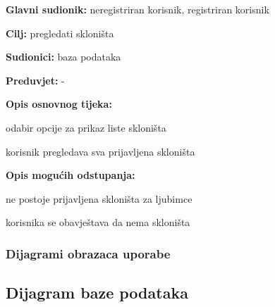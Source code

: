 					\noindent {}
					\begin{packed_item}
						
						\item \textbf{Glavni sudionik: } neregistriran korisnik, registriran korisnik
						\item  \textbf{Cilj:} pregledati skloništa
						\item  \textbf{Sudionici:} baza podataka
						\item  \textbf{Preduvjet:} -
						\item  \textbf{Opis osnovnog tijeka:}
						
						\item[] \begin{packed_enum}
							
							\item odabir opcije za prikaz liste skloništa
							\item korisnik pregledava sva prijavljena skloništa
						\end{packed_enum}
						
						\item  \textbf{Opis mogućih odstupanja:}
						
						\item[] \begin{packed_item}
							
							\item[1.a] ne postoje prijavljena skloništa za ljubimce
							\item[] \begin{packed_enum}
								\item  korisnika se obavještava da nema skloništa
							\end{packed_enum}
							
						\end{packed_item}
					\end{packed_item}
					
					
					
				\subsubsection{Dijagrami obrazaca uporabe}
					
					\subsection{Dijagram baze podataka}
					
